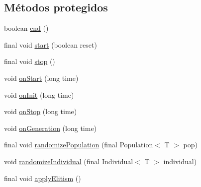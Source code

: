 \subsection*{Métodos protegidos}
\begin{DoxyCompactItemize}
\item 
boolean \hyperlink{classjenes_1_1_genetic_algorithm_3_01_t_01extends_01_chromosome_01_4_a41376d72c82d4503693eebb3832cf772}{end} ()
\item 
final void \hyperlink{classjenes_1_1_genetic_algorithm_3_01_t_01extends_01_chromosome_01_4_a6fd4badfc67b0c2b0d43c6dd4a14875e}{start} (boolean reset)
\item 
final void \hyperlink{classjenes_1_1_genetic_algorithm_3_01_t_01extends_01_chromosome_01_4_a6d0de9962bff7d63a4c197eeef6da7d0}{stop} ()
\item 
void \hyperlink{classjenes_1_1_genetic_algorithm_3_01_t_01extends_01_chromosome_01_4_a0ed4a97cf7e3266913eaad8092913de3}{on\-Start} (long time)
\item 
void \hyperlink{classjenes_1_1_genetic_algorithm_3_01_t_01extends_01_chromosome_01_4_a85479397ce0f8bd995b97fa91f4d6690}{on\-Init} (long time)
\item 
void \hyperlink{classjenes_1_1_genetic_algorithm_3_01_t_01extends_01_chromosome_01_4_a04258af6f64ec98561b015651d20f9ea}{on\-Stop} (long time)
\item 
void \hyperlink{classjenes_1_1_genetic_algorithm_3_01_t_01extends_01_chromosome_01_4_aed0d630f1e0b290bb87ba9ab8b164b89}{on\-Generation} (long time)
\item 
final void \hyperlink{classjenes_1_1_genetic_algorithm_3_01_t_01extends_01_chromosome_01_4_a7824bcf504331528000af8be62073d53}{randomize\-Population} (final Population$<$ T $>$ pop)
\item 
void \hyperlink{classjenes_1_1_genetic_algorithm_3_01_t_01extends_01_chromosome_01_4_a7cefcc35bf6c98eb9b7c33c074b32d69}{randomize\-Individual} (final Individual$<$ T $>$ individual)
\item 
final void \hyperlink{classjenes_1_1_genetic_algorithm_3_01_t_01extends_01_chromosome_01_4_a85647664d61cca550ed40dd70b074365}{apply\-Elitism} ()
\end{DoxyCompactItemize}
